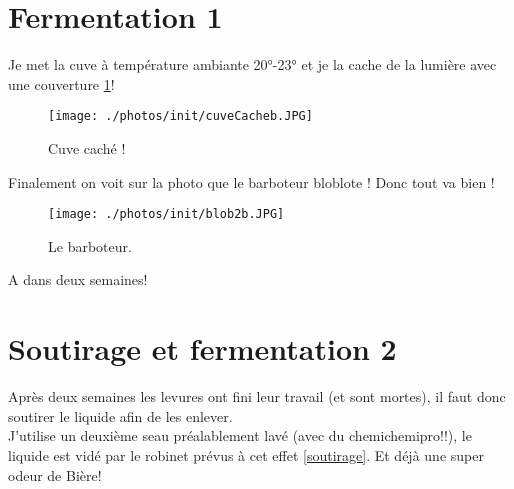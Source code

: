 \documentclass[twoside,twocolumn]{report}
\begin{document}
		\section{Fermentation 1}
			Je met la cuve à température ambiante 20°-23° et je la cache de la lumière avec une couverture  \ref{cuvec}!\\
			\begin{figure}[h!]
				\centering
				\texttt{[image: ./photos/init/cuveCacheb.JPG]}
				\caption{Cuve caché !}
				\label{cuvec}
			\end{figure}
			Finalement on voit sur la photo que le barboteur bloblote ! Donc tout va bien !
			 \begin{figure}[h!]
			 	\centering
			 	\texttt{[image: ./photos/init/blob2b.JPG]}
			 	\caption{Le barboteur.}
			 	\label{blob}
			 \end{figure}
			A dans deux semaines!
				 
		\section{Soutirage et fermentation 2}		 
		Après deux semaines les levures ont fini leur travail (et sont mortes), il faut donc soutirer le liquide afin de les enlever.\\
		J'utilise un deuxième seau préalablement lavé (avec du chemichemipro!!), le liquide est vidé par le robinet prévus à cet effet \ref{soutirage}. Et déjà une super odeur de Bière! \\
		
\end{document}
